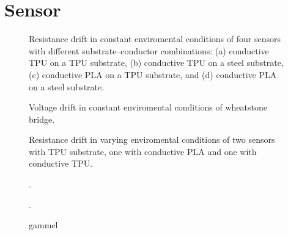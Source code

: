 \chapter{Sensor} \label{sec:Sensor}

\begin{figure}[H]
\centering

    \caption{Resistance drift in constant enviromental conditions of four sensors with different substrate–conductor combinations: (a) conductive TPU on a TPU substrate, (b) conductive TPU on a steel substrate, (c) conductive PLA on a TPU substrate, and (d) conductive PLA on a steel substrate.}
    \label{fig:2by2_drift}
\end{figure}

\begin{figure}[H]
\centering

    \caption{Voltage drift in constant enviromental conditions of wheatstone bridge.}
    \label{fig:Wheatstone_drift}
\end{figure}

\begin{figure}[H]
\centering

    \caption{Resistance drift in varying enviromental conditions of two sensors with TPU substrate, one with conductive PLA and one with conductive TPU.}
    \label{fig:TPUvsPLA_neg_deg}
\end{figure}

\begin{figure}[H]
\centering

    \caption{.}
    \label{fig:yes}
\end{figure}

\begin{figure}[H]
\centering

    \caption{.}
    \label{fig:yes}
\end{figure}

\begin{figure}[H]
\centering

    \caption{gammel}
    \label{fig:yes}
\end{figure}